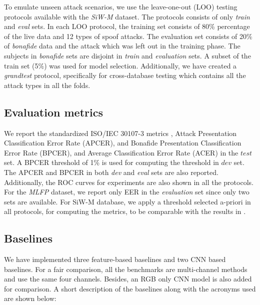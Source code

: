 \documentclass[journal]{IEEEtran}
\begin{document}
To emulate unseen attack scenarios, we use the leave-one-out (LOO) testing protocols available with the \textit{SiW-M} \cite{Liu_2019_CVPR} dataset. The protocols consists of only \textit{train} and \textit{eval} sets. In each LOO protocol, the training set consists of 80\% percentage of the live data and 12 types of spoof attacks. The evaluation set consists of 20\% of \textit{bonafide} data and the attack which was left out in the training phase. The subjects in \textit{bonafide} sets are disjoint in \textit{train} and \textit{evaluation} sets. A subset of the train set (5\%) was used for model selection.  Additionally, we have created a \textit{grandtest} protocol, specifically for cross-database testing which contains all the attack types in all the folds.

\subsection{Evaluation metrics}

We report the standardized ISO/IEC 30107-3 metrics \cite{ISO}, Attack Presentation Classification Error Rate (APCER),  and Bonafide Presentation Classification Error Rate (BPCER), and  Average Classification Error Rate (ACER) in the  $test$ set. A BPCER threshold of 1\% is used for computing the threshold in $dev$ set. The APCER and BPCER in both \textit{dev} and \textit{eval} sets are also reported. Additionally, the ROC curves for experiments are also shown in all the protocols. For the \textit{MLFP} dataset, we report only EER in the \textit{evaluation} set since only two sets are available. For SiW-M database, we apply a threshold selected a-priori in all protocols, for computing the metrics, to be comparable with the results in \cite{Liu_2019_CVPR}.
\subsection{Baselines}

We have implemented three feature-based baselines and two CNN based baselines. For a fair comparison, all the benchmarks are multi-channel methods and use the same four channels. Besides, an RGB only CNN model is also added for comparison.
A short description of the baselines along with the acronyms used are shown below:
\end{document}
